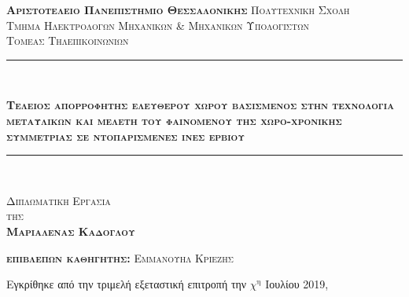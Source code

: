 \begin{titlepage}
\begin{center}
{\scshape\LARGE \textbf{Αριστοτελειο Πανεπιστημιο Θεσσαλονικης} Πολυτεχνικη Σχολη\\ Τμημα Ηλεκτρολογων Μηχανικων \& Μηχανικων Υπολογιστων\\ Τομεας Τηλεπικοινωνιων\par}
  
  
  \vspace{0.5in}
  
  \begin{minipage}{1.05\textwidth}                          %
\rule{\textwidth}{2pt}\\[\dimexpr-\baselineskip+1mm+2pt]
\end{minipage}


{\scshape\Huge\bfseries Τελειος απορροφητης ελευθερου χωρου βασισμενος στην τεχνολογια μεταϋλικων και μελετη του φαινομενου της χωρο-χρονικης συμμετριας σε ντοπαρισμενες ινες ερβιου\par}

   
  
  
  
  \end{center}
    \begin{minipage}{1.05\textwidth}                          %
\rule{\textwidth}{2pt}\\[\dimexpr-\baselineskip+1mm+2pt]
\end{minipage}


  \begin{center}
  \vspace{0.25in}
{\scshape\huge Διπλωματικη Εργασια\\ \vspace{1,5mm} \small της \\ \vspace{1,5mm} \huge \textbf{Μαριαλενας Καδογλου}  \par}
 
  \vspace{7mm}
  
  {\scshape\LARGE \textbf{επιβλεπων καθηγητης:} Εμμανουηλ Κριεζης \par}


\vspace{5mm}

\begin{flushleft}
\hspace{5mm}
Εγκρίθηκε από την τριμελή εξεταστική επιτροπή την $χ^{\text{η}}$ Ιουλίου 2019,
\end{flushleft}



\end{center}
\end{titlepage}

